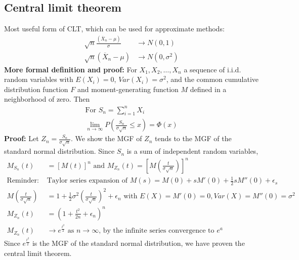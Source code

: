 \documentclass{article}
\begin{document}
\subsection{Central limit theorem}
Most useful form of CLT, which can be used for approximate methods:
\begin{align*}
	\sqrt{n}\frac{(\overline{X}_n - \mu)}{\sigma} &\longrightarrow N(0, 1)\\
	\sqrt{n}(\overline{X}_n - \mu) &\longrightarrow N(0, \sigma^2)
\end{align*}
\textbf{More formal definition and proof:} For $X_1, X_2, \dots, X_n$ a sequence of i.i.d. random variables with $E(X_i) = 0$,  $Var(X_i) = \sigma^2$, and the common cumulative distribution function $F$ and moment-generating function $M$ defined in a neighborhood of zero. Then
\begin{align*}
	\textrm{For } S_n = \sum_{i=1}^nX_i\\
	\lim_{n \rightarrow \infty}P(\frac{S_n}{\sigma \sqrt{n}} \leq x) = \Phi(x)
\end{align*}
\textbf{Proof:} Let $Z_n  = \frac{S_n}{\sigma \sqrt{n}}$. We show the MGF of $Z_n$ tends to the MGF of the standard normal distribution. Since $S_n$ is a sum of independent random variables,
\begin{align*}
	M_{S_n}(t) &= [M(t)]^n \textrm{ and } M_{Z_n}(t) = [M(\frac{t}{\sigma \sqrt{n}})]^n\\
	\textrm{Reminder: } & \textrm{Taylor series expansion of } M(s) = M(0)+sM'(0)+ \frac{1}{2}sM''(0) + \epsilon_s \\
	M(\frac{t}{\sigma\sqrt{n}}) &= 1 + \frac{1}{2}\sigma^2(\frac{t}{\sigma \sqrt{n}})^2 + \epsilon_n \textrm{ with } E(X) = M'(0) = 0, Var(X) = M''(0) = \sigma^2\\
	M_{Z_n}(t) &= (1 + \frac{t^2}{2n} + \epsilon_n)^n\\
	M_{Z_n}(t) &\longrightarrow e^{\frac{t^2}{2}} \textrm{ as } n \longrightarrow \infty \textrm{, by the infinite series convergence to $e^a$}
\end{align*}
Since $e^{\frac{t^2}{2}}$ is the MGF of the standard normal distribution, we have proven the central limit theorem.
\end{document}
